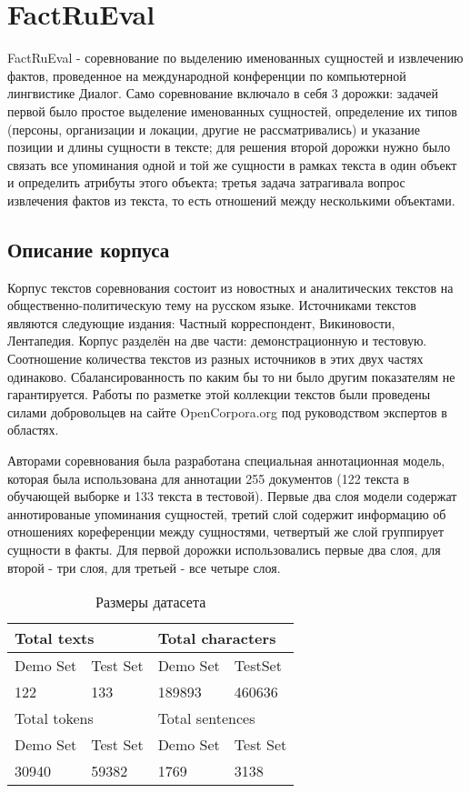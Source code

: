 \section{FactRuEval}

FactRuEval - соревнование по выделению именованных сущностей и извлечению фактов, проведенное на международной конференции по компьютерной лингвистике Диалог. Само соревнование включало в себя 3 дорожки: задачей первой было простое выделение именованных сущностей, определение их типов (персоны, организации и локации, другие не рассматривались) и указание позиции и длины сущности в тексте; для решения второй дорожки нужно было связать все упоминания одной и той же сущности в рамках текста в один объект и определить атрибуты этого объекта; третья задача затрагивала вопрос извлечения фактов из текста, то есть отношений между несколькими объектами.

\subsection{Описание корпуса}

Корпус текстов соревнования состоит из новостных и аналитических текстов на общественно-политическую тему на русском языке. Источниками текстов являются следующие издания: Частный корреспондент, Викиновости, Лентапедия. Корпус разделён на две части: демонстрационную и тестовую. Соотношение количества текстов из разных источников в этих двух частях одинаково. Сбалансированность по каким бы то ни было другим показателям не гарантируется. Работы по разметке этой коллекции текстов были проведены силами добровольцев на сайте OpenCorpora.org под руководством экспертов в областях.

Авторами соревнования была разработана специальная аннотационная модель, которая была использована для аннотации 255 документов (122 текста в обучающей выборке и 133 текста в тестовой). Первые два слоя модели содержат аннотированые упоминания сущностей, третий слой содержит информацию об отношениях кореференции между сущностями, четвертый же слой группирует сущности в факты. Для первой дорожки использовались первые два слоя, для второй - три слоя, для третьей - все четыре слоя.


\begin{table}[ht]
\centering
\caption{Размеры датасета}
\label{factrueval_sizes}
\begin{tabular}{|l|l|l|l|}
\hline
\multicolumn{2}{|l|}{Total texts}  & \multicolumn{2}{l|}{Total characters} \\ \hline
Demo Set         & Test Set        & Demo Set          & TestSet           \\ \hline
122              & 133             & 189893            & 460636            \\ \hline
\multicolumn{2}{|l|}{Total tokens} & \multicolumn{2}{l|}{Total sentences}  \\ \hline
Demo Set         & Test Set        & Demo Set          & Test Set          \\ \hline
30940            & 59382           & 1769              & 3138              \\ \hline
\end{tabular}
\end{table}


